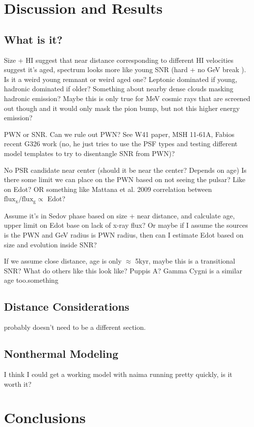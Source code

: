 \documentclass[preprint2]{aastex}
\begin{document}
%
%
\section{\label{sec:Discuss}Discussion and Results}
\subsection{\label{sec:What}What is it?}
Size + HI suggest that near distance corresponding to different HI velocities suggest it's aged, spectrum looks more like young SNR (hard + no GeV break ). Is it a weird young remnant or weird aged one? Leptonic dominated if young, hadronic dominated if older? Something about nearby dense clouds masking hadronic emission? Maybe this is only true for MeV cosmic rays that are screened out though and it would only mask the pion bump, but not this higher energy emission?

PWN or SNR. Can we rule out PWN? See W41 paper, MSH 11-61A, Fabios recent G326 work (no, he just tries to use the PSF types and testing different model templates to try to disentangle SNR from PWN)?

No PSR candidate near center (should it be near the center? Depends on age)
Is there some limit we can place on the PWN based on not seeing the pulsar? Like on Edot? OR something like Mattana et al. 2009 correlation between  $\mathrm{flux_x / flux_g \propto}$   Edot? 

Assume it's in Sedov phase based on size + near distance, and calculate age, upper limit on Edot base on lack of x-ray flux? Or maybe if I assume the sources is the PWN and GeV radius is PWN radius, then can I estimate Edot based on size and evolution inside  SNR?

If we assume close distance, age is only $\approx$ 5kyr, maybe this is a transitional SNR? What do others like this look like? Puppis A? Gamma Cygni is a similar age too.something 


\subsection{\label{sec:Dist}Distance Considerations}
probably doesn't need to be a different section. 
\subsection{\label{secModel}Nonthermal Modeling}
I think I could get a working model with naima running pretty quickly, is it worth it?
%
%
\section{\label{sec:Conc}Conclusions}



%
%


%

\end{document}
